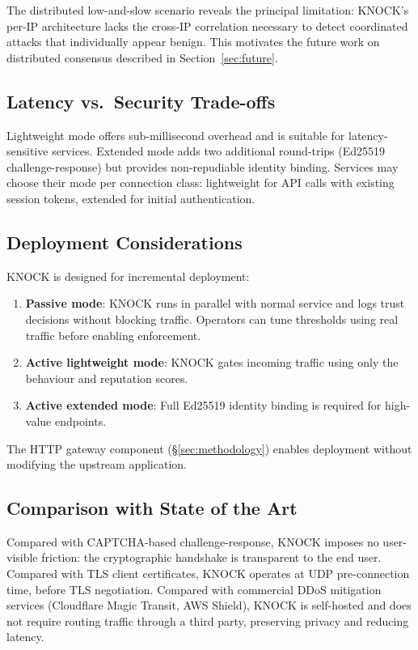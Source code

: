 \documentclass[10pt,conference]{IEEEtran}
\begin{document}
The distributed low-and-slow scenario reveals the principal limitation:
KNOCK's per-IP architecture lacks the cross-IP correlation necessary
to detect coordinated attacks that individually appear benign.
This motivates the future work on distributed consensus described in
Section~\ref{sec:future}.

\subsection{Latency vs.\ Security Trade-offs}

Lightweight mode offers sub-millisecond overhead and is suitable for
latency-sensitive services.  Extended mode adds two additional
round-trips (Ed25519 challenge-response) but provides non-repudiable
identity binding.  Services may choose their mode per connection
class: lightweight for API calls with existing session tokens,
extended for initial authentication.

\subsection{Deployment Considerations}

KNOCK is designed for incremental deployment:
\begin{enumerate}[leftmargin=*]
  \item \textbf{Passive mode}: KNOCK runs in parallel with normal
    service and logs trust decisions without blocking traffic.
    Operators can tune thresholds using real traffic before enabling
    enforcement.
  \item \textbf{Active lightweight mode}: KNOCK gates incoming traffic
    using only the behaviour and reputation scores.
  \item \textbf{Active extended mode}: Full Ed25519 identity binding
    is required for high-value endpoints.
\end{enumerate}

The HTTP gateway component (\S\ref{sec:methodology}) enables
deployment without modifying the upstream application.

\subsection{Comparison with State of the Art}

Compared with CAPTCHA-based challenge-response, KNOCK imposes no
user-visible friction: the cryptographic handshake is transparent to
the end user.  Compared with TLS client certificates, KNOCK operates
at UDP pre-connection time, before TLS negotiation.  Compared with
commercial DDoS mitigation services (Cloudflare Magic Transit, AWS
Shield), KNOCK is self-hosted and does not require routing traffic
through a third party, preserving privacy and reducing latency.
\end{document}
